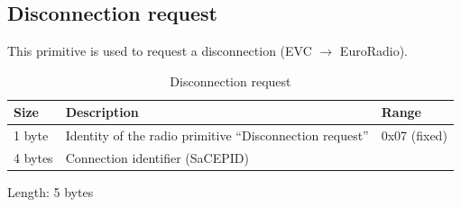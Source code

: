 \documentclass[nocc]{template/openetcs_report}
\begin{document}
\subsection{Disconnection request}
This primitive is used to request a disconnection (EVC $\rightarrow$ EuroRadio).
 			\begin{longtable}{|l|l|l|}
				\caption{Disconnection request}\\ 
				\hline
				
					\begin{minipage}[t]{0.1\linewidth} \textbf{Size}	\end{minipage}
				&	\begin{minipage}[t]{0.5\linewidth} \textbf{Description}	\end{minipage}
				&	\begin{minipage}[t]{0.3\linewidth} \textbf{Range} \end{minipage} \\
				
				\hline
					 \begin{minipage}[t]{0.1\linewidth}1 byte \end{minipage}
					&\begin{minipage}[t]{0.6\linewidth}Identity of the radio primitive "`Disconnection request"'	\end{minipage}
					&\begin{minipage}[t]{0.3\linewidth}0x07 (fixed) \end{minipage} \\
					
				\hline
					 \begin{minipage}[t]{0.1\linewidth}4 bytes \end{minipage}
					&\begin{minipage}[t]{0.6\linewidth}Connection identifier (SaCEPID)	\end{minipage}
					&\begin{minipage}[t]{0.3\linewidth} \end{minipage} \\
					
				\hline
			\end{longtable}
			Length: 5 bytes
\end{document}
